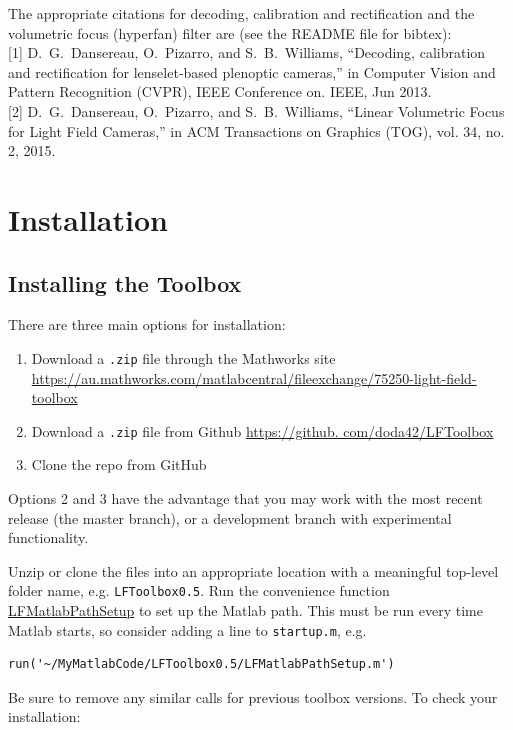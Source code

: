 \documentclass[onecolumn]{article}
\newcommand{\CiteFunc}[1]{\hyperlink{#1}{\small #1}}
\newcommand{\SymbolText}[1]{\texttt{\small #1}}
\begin{document}
The appropriate citations for decoding, calibration and rectification and the volumetric focus (hyperfan) filter are (see the README file for bibtex): \vspace{0.5em} \\ 
\footnotesize [1] \small{D.\ G.\ Dansereau, O.\ Pizarro, and S.\ B.\ Williams, ``Decoding, calibration and rectification for lenselet-based plenoptic cameras,'' in Computer Vision and Pattern Recognition (CVPR), IEEE Conference on. IEEE, Jun 2013.} \vspace{0.5em} \\ 
\footnotesize [2] \small{D.\ G.\ Dansereau, O.\ Pizarro, and S.\ B.\ Williams, ``Linear Volumetric Focus for Light Field Cameras,'' in ACM Transactions on Graphics (TOG), vol. 34, no. 2, 2015.}

\newpage
\tableofcontents
\newpage

\section{Installation}
\label{sect_Installation}

\subsection{Installing the Toolbox}

There are three main options for installation:
\begin{enumerate}[leftmargin=2.2em,itemsep=0em,rightmargin=0.5cm]
\item Download a \SymbolText{.zip} file through the Mathworks site \url{https://au.mathworks.com/matlabcentral/fileexchange/75250-light-field-toolbox}
\item Download a \SymbolText{.zip} file from Github \url{https://github.
com/doda42/LFToolbox}
\item Clone the repo from GitHub
\end{enumerate}
Options 2 and 3 have the advantage that you may work with the most recent release (the master branch), or a development branch with experimental functionality. 

Unzip or clone the files into an appropriate location with a meaningful top-level folder name, e.g. \SymbolText{LFToolbox0.5}. Run the convenience function \CiteFunc{LFMatlabPathSetup} to set up the Matlab path.  This must be run every time Matlab starts, so consider adding a line to \SymbolText{startup.m}, e.g.
\begin{Verbatim}
run('~/MyMatlabCode/LFToolbox0.5/LFMatlabPathSetup.m')
\end{Verbatim}
Be sure to remove any similar calls for previous toolbox versions. To check your installation:
\end{document}
